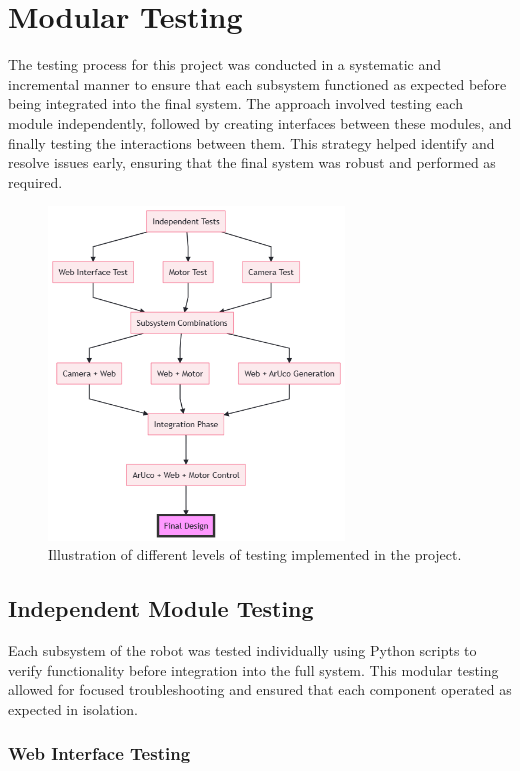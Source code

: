 \chapter{Modular Testing}

The testing process for this project was conducted in a systematic and incremental manner to ensure that each subsystem functioned as expected before being integrated into the final system. The approach involved testing each module independently, followed by creating interfaces between these modules, and finally testing the interactions between them. This strategy helped identify and resolve issues early, ensuring that the final system was robust and performed as required.

\begin{figure}[H]
	\centering
	\includegraphics[width=0.7\textwidth]{Testing/figs/flow.png}
	\caption{Illustration of different levels of testing implemented in the project.}
	\label{fig:testing_levels}
\end{figure}

\section{Independent Module Testing}

Each subsystem of the robot was tested individually using Python scripts to verify functionality before integration into the full system. This modular testing allowed for focused troubleshooting and ensured that each component operated as expected in isolation.

\subsection{Web Interface Testing}

